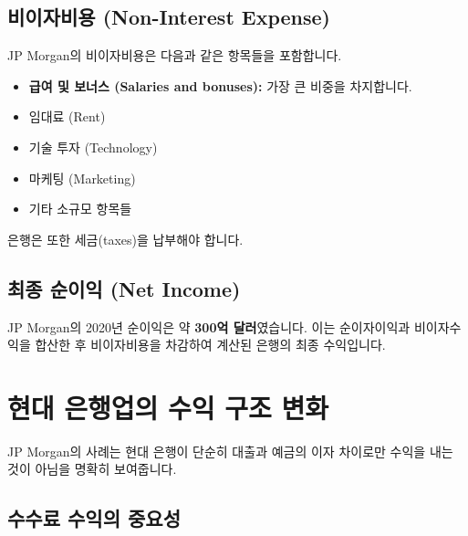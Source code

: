 \documentclass[11pt,a4paper]{article}
\begin{document}
\subsection*{비이자비용 (Non-Interest Expense)}

JP Morgan의 비이자비용은 다음과 같은 항목들을 포함합니다.

\begin{itemize}
    \item \textbf{급여 및 보너스 (Salaries and bonuses):} 가장 큰 비중을 차지합니다.
    \item 임대료 (Rent)
    \item 기술 투자 (Technology)
    \item 마케팅 (Marketing)
    \item 기타 소규모 항목들
\end{itemize}
은행은 또한 세금(taxes)을 납부해야 합니다.

\subsection*{최종 순이익 (Net Income)}

JP Morgan의 2020년 순이익은 약 \textbf{300억 달러}였습니다. 이는 순이자이익과 비이자수익을 합산한 후 비이자비용을 차감하여 계산된 은행의 최종 수익입니다.

\newpage
\section*{현대 은행업의 수익 구조 변화}

JP Morgan의 사례는 현대 은행이 단순히 대출과 예금의 이자 차이로만 수익을 내는 것이 아님을 명확히 보여줍니다.

\subsection*{수수료 수익의 중요성}
\end{document}

